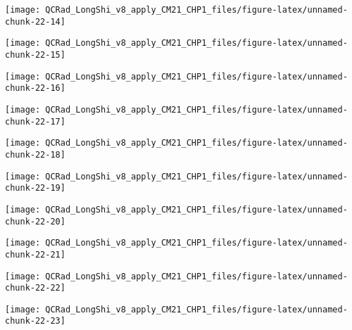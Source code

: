 \documentclass[
  10pt,
  a4paper,oneside]{article}
\begin{document}
\begin{center}\texttt{[image: QCRad\_LongShi\_v8\_apply\_CM21\_CHP1\_files/figure-latex/unnamed-chunk-22-14]} \end{center}

\begin{center}\texttt{[image: QCRad\_LongShi\_v8\_apply\_CM21\_CHP1\_files/figure-latex/unnamed-chunk-22-15]} \end{center}

\begin{center}\texttt{[image: QCRad\_LongShi\_v8\_apply\_CM21\_CHP1\_files/figure-latex/unnamed-chunk-22-16]} \end{center}

\begin{center}\texttt{[image: QCRad\_LongShi\_v8\_apply\_CM21\_CHP1\_files/figure-latex/unnamed-chunk-22-17]} \end{center}

\begin{center}\texttt{[image: QCRad\_LongShi\_v8\_apply\_CM21\_CHP1\_files/figure-latex/unnamed-chunk-22-18]} \end{center}

\begin{center}\texttt{[image: QCRad\_LongShi\_v8\_apply\_CM21\_CHP1\_files/figure-latex/unnamed-chunk-22-19]} \end{center}

\begin{center}\texttt{[image: QCRad\_LongShi\_v8\_apply\_CM21\_CHP1\_files/figure-latex/unnamed-chunk-22-20]} \end{center}

\begin{center}\texttt{[image: QCRad\_LongShi\_v8\_apply\_CM21\_CHP1\_files/figure-latex/unnamed-chunk-22-21]} \end{center}

\begin{center}\texttt{[image: QCRad\_LongShi\_v8\_apply\_CM21\_CHP1\_files/figure-latex/unnamed-chunk-22-22]} \end{center}

\begin{center}\texttt{[image: QCRad\_LongShi\_v8\_apply\_CM21\_CHP1\_files/figure-latex/unnamed-chunk-22-23]} \end{center}
\end{document}
